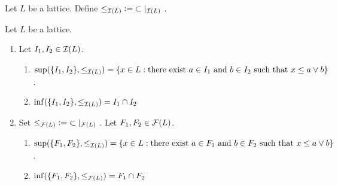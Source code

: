 \documentclass{book}
\begin{document}
	\begin{defn}
		Let $L$ be a lattice. Define ${\leq_{\mathcal{I}(L)}} \vcentcolon= {\subset|_{\mathcal{I}(L)}}$ .
	\end{defn}
	
	\begin{ex}
		Let $L$ be a lattice. 
		\begin{enumerate}
			\item Let $I_1, I_2 \in \mathcal{I}(L)$.
			\begin{enumerate}
				\item $\sup(\{I_1, I_2 \}, \leq_{\mathcal{I}(L)}) = \{x \in L: \text{there exist $a \in I_1$ and $b \in I_2$ such that $x \leq a \vee b$} \}$.
				\item $\inf(\{I_1, I_2 \}, \leq_{\mathcal{I}(L)}) = I_1 \cap I_2$
			\end{enumerate}
			\item Set ${\leq_{\mathcal{F}(L)}} \vcentcolon= {\subset|_{\mathcal{F}(L)}}$ . Let $F_1, F_2 \in \mathcal{F}(L)$. 
			\begin{enumerate}
				\item $\sup(\{F_1, F_2 \}, \leq_{\mathcal{I}(L)}) = \{x \in L: \text{there exist $a \in F_1$ and $b \in F_2$ such that $x \leq a \vee b$} \}$.
				\item $\inf(\{F_1, F_2 \}, \leq_{\mathcal{F}(L)}) = F_1 \cap F_2$
			\end{enumerate}
		\end{enumerate}
	\end{ex}
	
\end{document}

